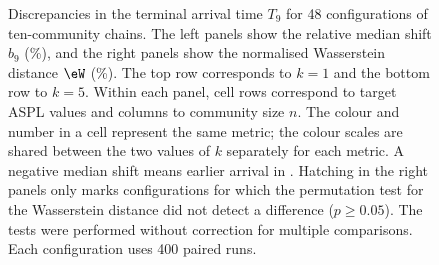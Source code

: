 \begin{figure}[!tbp]
\caption{%
Discrepancies in the terminal arrival time $T_9$ for 48 configurations of ten-community chains.
The left panels show the relative median shift $b_9$ (\%), and the right panels show the normalised Wasserstein distance $\eW$ (\%). The top row corresponds to $k=1$ and the bottom row to $k=5$.
Within each panel, cell rows correspond to target ASPL values and columns to community size $n$.
The colour and number in a cell represent the same metric; the colour scales are shared between the two values of $k$ separately for each metric.
A negative median shift means earlier arrival in \TS{}.
Hatching in the right panels only marks configurations for which the permutation test for the Wasserstein distance did not detect a difference ($p\geq0.05$).
The tests were performed without correction for multiple comparisons.
Each configuration uses 400 paired runs.
}
\label{fig:accuracy_map}
\end{figure}
